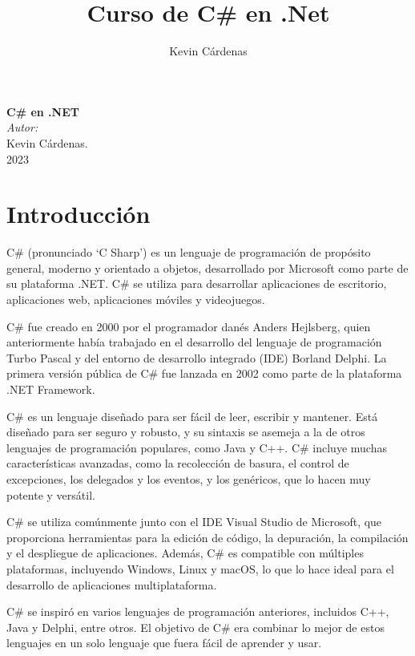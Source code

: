\documentclass[executivepaper]{article}
\title{Curso de C\# en .Net}
\author{Kevin Cárdenas}
\begin{document}
\begin{titlepage}
   \begin{center}
        {\Huge \textbf{C\# en .NET}}
        \\[19cm]
        
        \large\emph{Autor:}\\
        Kevin Cárdenas.
        \\
        2023
    \end{center}
\end{titlepage}

\newpage
\tableofcontents
\newpage

\section{Introducción}
C\# (pronunciado \enquote*{C Sharp}) es un lenguaje de programación de propósito general, moderno y orientado a objetos, desarrollado por Microsoft como parte de su plataforma .NET. C\# se utiliza para desarrollar aplicaciones de escritorio, aplicaciones web, aplicaciones móviles y videojuegos.

C\# fue creado en 2000 por el programador danés Anders Hejlsberg, quien anteriormente había trabajado en el desarrollo del lenguaje de programación Turbo Pascal y del entorno de desarrollo integrado (IDE) Borland Delphi. La primera versión pública de C\# fue lanzada en 2002 como parte de la plataforma .NET Framework.

C\# es un lenguaje diseñado para ser fácil de leer, escribir y mantener. Está diseñado para ser seguro y robusto, y su sintaxis se asemeja a la de otros lenguajes de programación populares, como Java y C++. C\# incluye muchas características avanzadas, como la recolección de basura, el control de excepciones, los delegados y los eventos, y los genéricos, que lo hacen muy potente y versátil.

C\# se utiliza comúnmente junto con el IDE Visual Studio de Microsoft, que proporciona herramientas para la edición de código, la depuración, la compilación y el despliegue de aplicaciones. Además, C\# es compatible con múltiples plataformas, incluyendo Windows, Linux y macOS, lo que lo hace ideal para el desarrollo de aplicaciones multiplataforma.

C\# se inspiró en varios lenguajes de programación anteriores, incluidos C++, Java y Delphi, entre otros. El objetivo de C\# era combinar lo mejor de estos lenguajes en un solo lenguaje que fuera fácil de aprender y usar.
\end{document}
